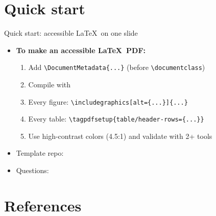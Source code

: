 \section{Quick start}

\begin{frame}{Quick start: accessible \LaTeX\ on one slide}
\begin{itemize}
\item \textbf{To make an accessible \LaTeX\ PDF:}
  \begin{enumerate}
  \item Add \texttt{\textbackslash DocumentMetadata\{...\}} (before \texttt{\textbackslash documentclass})
  \item Compile with 
  \item Every figure: \texttt{\textbackslash includegraphics[alt=\{...\}]\{...\}}
  \item Every table: \texttt{\textbackslash tagpdfsetup\{table/header-rows=\{...\}\}}
  \item Use high-contrast colors (4.5:1) and validate with 2+ tools
  \end{enumerate}

\bigskip

\item Template repo: 
\item Questions: 
\end{itemize}
\end{frame}


\section{References}


%
%
%

